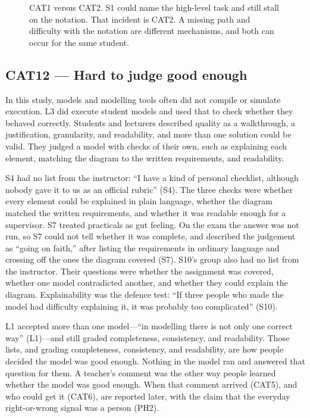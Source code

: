 \begin{figure}[htbp]
\centering

\caption{CAT1 versus CAT2. S1 could name the high-level task and still stall on the notation. That incident is CAT2. A missing path and difficulty with the notation are different mechanisms, and both can occur for the same student.}
\label{fig:cat1_vs_cat2}
\end{figure}

\subsection{CAT12 --- Hard to judge good enough}
\label{sec:cat12}

In this study, models and modelling tools often did not compile or simulate execution. L3 did execute student models and used that to check whether they behaved correctly. Students and lecturers described quality as a walkthrough, a justification, granularity, and readability, and more than one solution could be valid. They judged a model with checks of their own, such as explaining each element, matching the diagram to the written requirements, and readability.

S4 had no list from the instructor: ``I have a kind of personal checklist, although nobody gave it to us as an official rubric'' (S4). The three checks were whether every element could be explained in plain language, whether the diagram matched the written requirements, and whether it was readable enough for a supervisor. S7 treated practicals as gut feeling. On the exam the answer was not run, so S7 could not tell whether it was complete, and described the judgement as ``going on faith,'' after listing the requirements in ordinary language and crossing off the ones the diagram covered (S7). S10's group also had no list from the instructor. Their questions were whether the assignment was covered, whether one model contradicted another, and whether they could explain the diagram. Explainability was the defence test: ``If three people who made the model had difficulty explaining it, it was probably too complicated'' (S10).

L1 accepted more than one model---``in modelling there is not only one correct way'' (L1)---and still graded completeness, consistency, and readability. Those lists, and grading completeness, consistency, and readability, are how people decided the model was good enough. Nothing in the model ran and answered that question for them. A teacher's comment was the other way people learned whether the model was good enough. When that comment arrived (CAT5), and who could get it (CAT6), are reported later, with the claim that the everyday right-or-wrong signal was a person (PH2).

